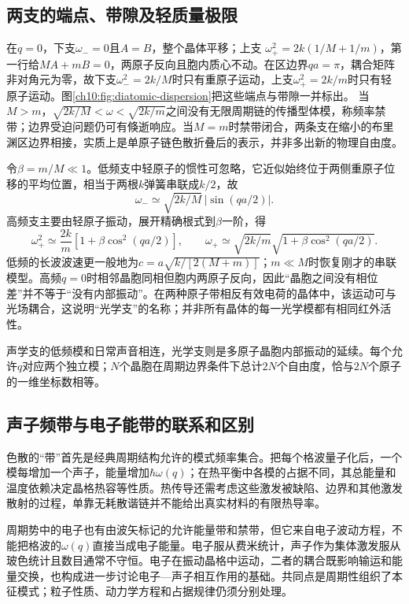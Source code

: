 \subsection{两支的端点、带隙及轻质量极限}
在$q=0$，下支$\omega_-=0$且$A=B$，整个晶体平移；上支
$\omega_+^2=2k(1/M+1/m)$，第一行给$MA+mB=0$，两原子反向且胞内质心不动。在区边界$qa=\pi$，耦合矩阵非对角元为零，故下支$\omega_-^2=2k/M$时只有重原子运动，上支$\omega_+^2=2k/m$时只有轻原子运动。图\ref{ch10:fig:diatomic-dispersion}把这些端点与带隙一并标出。
\chTenDiatomicDispersionFigure
当$M>m$，$\sqrt{2k/M}<\omega<\sqrt{2k/m}$之间没有无限周期链的传播型体模，称频率禁带；边界受迫问题仍可有倏逝响应。当$M=m$时禁带闭合，两条支在缩小的布里渊区边界相接，实质上是单原子链色散折叠后的表示，并非多出新的物理自由度。

令$\beta=m/M\ll1$。低频支中轻原子的惯性可忽略，它近似始终位于两侧重原子位移的平均位置，相当于两根$k$弹簧串联成$k/2$，故
\[
 \omega_-\simeq\sqrt{2k/M}\,|\sin(qa/2)|.
\]
高频支主要由轻原子振动，展开精确根式到$\beta$一阶，得
\[
 \omega_+^2\simeq\frac{2k}{m}\left[1+\beta\cos^2(qa/2)\right],
 \qquad\omega_+\simeq\sqrt{2k/m}\sqrt{1+\beta\cos^2(qa/2)}.
\]
低频的长波波速更一般地为$c=a\sqrt{k/[2(M+m)]}$；$m\ll M$时恢复刚才的串联模型。高频$q=0$时相邻晶胞同相但胞内两原子反向，因此“晶胞之间没有相位差”并不等于“没有内部振动”。在两种原子带相反有效电荷的晶体中，该运动可与光场耦合，这说明“光学支”的名称；并非所有晶体的每一光学模都有相同红外活性。

声学支的低频模和日常声音相连，光学支则是多原子晶胞内部振动的延续。每个允许$q$对应两个独立模；$N$个晶胞在周期边界条件下总计$2N$个自由度，恰与$2N$个原子的一维坐标数相等。

\subsection{声子频带与电子能带的联系和区别}
色散的“带”首先是经典周期结构允许的模式频率集合。把每个格波量子化后，一个模每增加一个声子，能量增加$\hbar\omega(q)$；在热平衡中各模的占据不同，其总能量和温度依赖决定晶格热容等性质。热传导还需考虑这些激发被缺陷、边界和其他激发散射的过程，单靠无耗散谐链并不能给出真实材料的有限热导率。

周期势中的电子也有由波矢标记的允许能量带和禁带，但它来自电子波动方程，不能把格波的$\omega(q)$直接当成电子能量。电子服从费米统计，声子作为集体激发服从玻色统计且数目通常不守恒。电子在振动晶格中运动，二者的耦合既影响输运和能量交换，也构成进一步讨论电子—声子相互作用的基础。共同点是周期性组织了本征模式；粒子性质、动力学方程和占据规律仍须分别处理。
